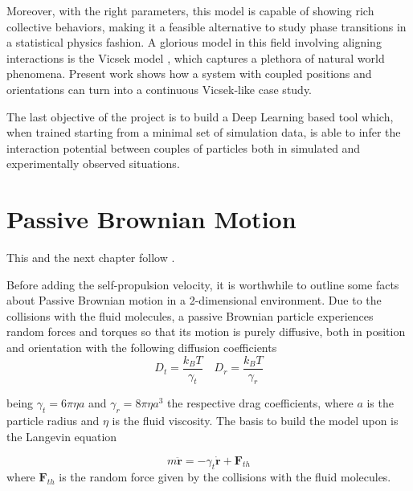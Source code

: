 \documentclass[../../master_thesis_np.tex]{subfiles}
\begin{document}
	Moreover, with the right parameters, this model is capable of showing rich collective behaviors, making it a feasible alternative to study phase transitions in a statistical physics fashion. A glorious model in this field involving aligning interactions is the Vicsek model \parencite{vicsek_novel_1995}, which captures a plethora of natural world phenomena. Present work shows how a system with coupled positions and orientations can turn into a continuous Vicsek-like case study.
	
	The last objective of the project is to build a Deep Learning based tool which, when trained starting from a minimal set of simulation data, is able to infer the interaction potential between couples of particles both in simulated and experimentally observed situations.
	\newpage
	\section{Passive Brownian Motion}
	{\color{blue} This and the next chapter follow \parencite{callegari_numerical_2019}.}

	Before adding the self-propulsion velocity, it is worthwhile to outline some facts about Passive Brownian motion in a 2-dimensional environment.
	Due to the collisions with the fluid molecules, a passive Brownian particle experiences random forces and torques so that its motion is purely diffusive, both in position and orientation with the following diffusion coefficients
	\begin{equation}
		D_t = \frac{k_B T}{\gamma_t} \quad D_r = \frac{k_B T}{\gamma_r} 
	\end{equation}
	
	being $\gamma_t = 6 \pi \eta a$ and $\gamma_r = 8 \pi \eta a^3$  the respective drag coefficients, where $a$ is the particle radius and $\eta$ is the fluid viscosity. The basis to build the model upon is the Langevin equation
	
	\begin{equation} \label{eq:lang1}
		m \mathbf{\ddot{r}} = -\gamma_t \mathbf{\dot{r}} + \mathbf{F}_{th}
	\end{equation} 
	where $\mathbf{F}_{th}$ is the random force given by the collisions with the fluid molecules.
	
\end{document}

